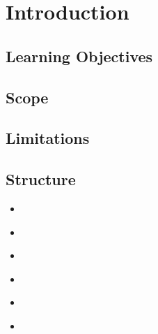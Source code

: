 \chapter{Introduction}
\section{Learning Objectives}

\section{Scope}

\section{Limitations}

\section{Structure}

\begin{itemize}
	\item {}\\
	
	\item {}\\
	
	\item {}\\
	
	\item {}\\
	
	\item {}\\
	
	\item {}\\
	
\end{itemize}